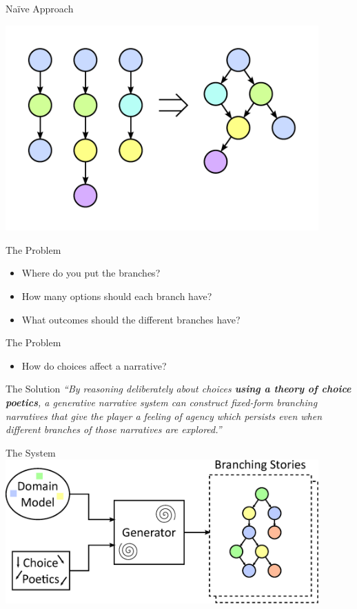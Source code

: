 \documentclass[xcolor=x11names]{beamer}
\begin{document}
\begin{frame}{Na\"{i}ve Approach}
\begin{center}
  \includegraphics[width=0.9\textwidth]{res/naive-cyoa.pdf}
\end{center}
\end{frame}

\begin{frame}{The Problem}
\begin{itemize}
  \item Where do you put the branches?
  \item How many options should each branch have?
  \item What outcomes should the different branches have?
\end{itemize}
\end{frame}

\begin{frame}{The Problem}
\begin{itemize}
  \item How do choices affect a narrative?
\end{itemize}
\end{frame}

\begin{frame}{The Solution}
  \itshape
  ``By reasoning deliberately about choices \textbf{using a theory of choice poetics}, a generative narrative system can construct fixed-form branching narratives that give the player a feeling of agency which persists even when different branches of those narratives are explored.''
\end{frame}

\begin{frame}{The System}
  \includegraphics[width=0.9\textwidth]{res/high-level-architecture.eps}
\end{frame}
\end{document}

